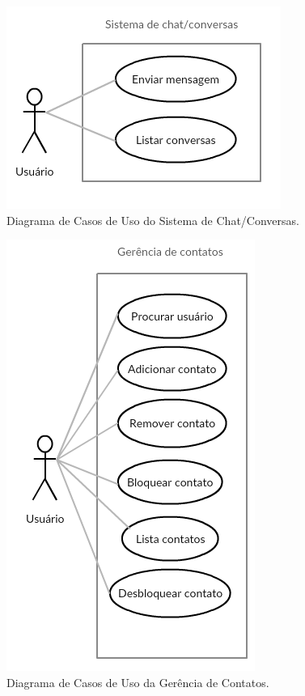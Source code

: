 \documentclass[11pt,a4paper,titlepage]{article}
\begin{document}
\begin{figure}[!h]
	\centering
	\includegraphics[scale=0.8]{img/casoschat.png}
	\caption{Diagrama de Casos de Uso do Sistema de Chat/Conversas.}
\end{figure}
\begin{figure}[!h]
	\centering
	\includegraphics[scale=0.8]{img/casoscontatos.png}
	\caption{Diagrama de Casos de Uso da Gerência de Contatos.}
\end{figure}
\end{document}
